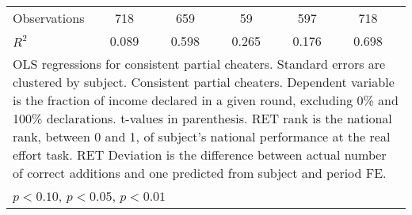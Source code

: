 {\begin{tabular}{l*{5}{cc}}
\hline
Observations    &      718         &         &      659         &         &       59         &         &      597         &         &      718         &         \\
\(R^{2}\)       &    0.089         &         &    0.598         &         &    0.265         &         &    0.176         &         &    0.698         &         \\
\hline\hline
\multicolumn{11}{p{19cm}}{\tiny OLS regressions for consistent partial cheaters. Standard errors are clustered by subject. Consistent partial cheaters. Dependent variable is the fraction of income declared in a given round, excluding 0\% and 100\% declarations. t-values in parenthesis. RET rank is the national rank, between 0 and 1, of subject's national performance at the real effort task. RET Deviation is the difference between actual number of correct additions and one predicted from subject and period FE.}\\
\multicolumn{11}{l}{\footnotesize \sym{*} \(p<0.10\), \sym{**} \(p<0.05\), \sym{***} \(p<0.01\)}\\
\end{tabular}
}
